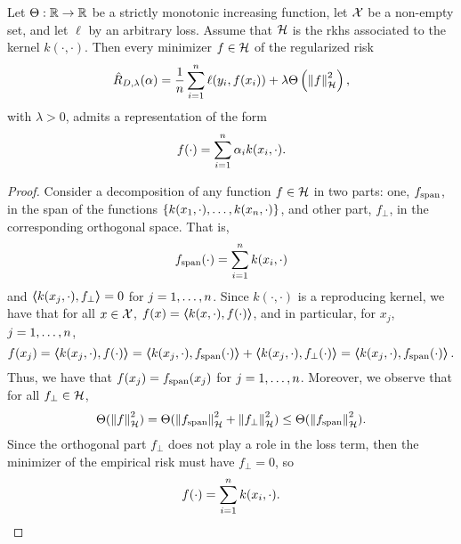 \begin{theorem}\label{th:repr_theorem}
    Let $\Theta: \mathbb{R} \to \mathbb{R}$ be a strictly monotonic increasing function, let $\mathcal{X}$ be a non-empty set, and let $\ell$ by an arbitrary loss. Assume that $\mathcal{H}$ is the \acrshort{rkhs} associated to the kernel $k(\cdot, \cdot)$.
    Then every minimizer $f \in \mathcal{H}$ of the regularized risk 
    \begin{equation}
        \nonumber
        \hat{R}_{D, \lambda}(\alpha) = \frac{1}{n} \sum_{i=1}^n \ell(y_i, f(x_i)) + \lambda \Theta\left(\left\lVert f\right\rVert^2_{\mathcal{H}} \right) ,
    \end{equation}
    with $\lambda > 0$, admits a representation of the form
    \begin{equation}
        \label{eq:reprth_def}
        f(\cdot) = \sum_{i=1}^\nsamples \alpha_i k(x_i, \cdot) .
    \end{equation}
\end{theorem}
\begin{proof}
    Consider a decomposition of any function $f \in \mathcal{H}$ in two parts: one, $f_{\operatorname{span}}$, in the span of the functions $\left\{k(x_1, \cdot), \ldots, k(x_n, \cdot)\right\}$, and other part, $f_{\perp}$, in the corresponding orthogonal space. That is,
    \begin{equation}
        \nonumber
        f_{\operatorname{span}}(\cdot) = \sum_{i=1}^n k(x_i, \cdot)
    \end{equation}
    and $\bm{\left\langle} k(x_j, \cdot), f_{\perp} \bm{\right\rangle} = 0$ for $j=1, \ldots, n$.
%
    Since $k(\cdot, \cdot)$ is a reproducing kernel, we have that for all $x \in \mathcal{X}$, 
    $f(x) = \bm{\left\langle} k(x, \cdot), f(\cdot) \bm{\right\rangle}$, and in particular, for $x_j$, $j=1, \ldots, n$,
    \begin{equation}
        \nonumber
        f(x_j) = \bm{\left\langle} k(x_j, \cdot), f(\cdot) \bm{\right\rangle} = \bm{\left\langle} k(x_j, \cdot), f_{\operatorname{span}}(\cdot) \bm{\right\rangle} + \bm{\left\langle} k(x_j, \cdot), f_{\perp}(\cdot) \bm{\right\rangle} = \bm{\left\langle} k(x_j, \cdot), f_{\operatorname{span}}(\cdot) \bm{\right\rangle}.
    \end{equation}
    Thus, we have that $f(x_j) = f_{\operatorname{span}}(x_j)$ for $j=1, \ldots, n$.
    Moreover, we observe that for all $f_{\perp} \in \mathcal{H}$,
    \begin{equation}
        \nonumber
        \Theta(\left\lVert f\right\rVert_{\mathcal{H}}^2) = \Theta(\left\lVert f_{\operatorname{span}}\right\rVert_{\mathcal{H}}^2 + \left\lVert f_{\perp}\right\rVert_{\mathcal{H}}^2) \leq \Theta(\left\lVert f_{\operatorname{span}}\right\rVert_{\mathcal{H}}^2) .
    \end{equation}
    Since the orthogonal part $f_{\perp}$ does not play a role in the loss term, then the minimizer of the empirical risk must have $f_{\perp} = 0$, so 
    $$ f(\cdot) = \sum_{i=1}^n k(x_i, \cdot).$$
\end{proof}
